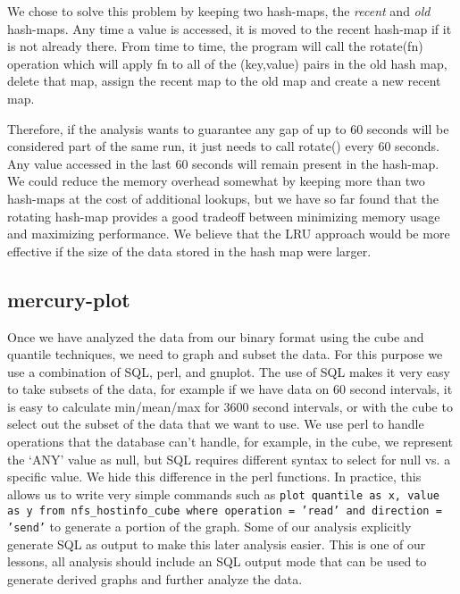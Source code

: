 We chose to solve this problem by keeping two hash-maps, the {\it
recent} and {\it old} hash-maps.  Any time a value is accessed, it is
moved to the recent hash-map if it is not already there.  From time to
time, the program will call the rotate(fn) operation which will apply
fn to all of the (key,value) pairs in the old hash map, delete that map,
assign the recent map to the old map and create a new recent map.

Therefore, if the analysis wants to guarantee any gap of up to 60
seconds will be considered part of the same run, it just needs to call
rotate() every 60 seconds.  Any value accessed in the last 60 seconds
will remain present in the hash-map.  We could reduce the memory
overhead somewhat by keeping more than two hash-maps at the cost of
additional lookups, but we have so far found that the rotating
hash-map provides a good tradeoff between minimizing memory usage and
maximizing performance.  We believe that the LRU approach would be
more effective if the size of the data stored in the hash map were
larger.

\subsection{mercury-plot}

Once we have analyzed the data from our binary format using the cube
and quantile techniques, we need to graph and subset the data.  For
this purpose we use a combination of SQL, perl, and gnuplot.  The use
of SQL makes it very easy to take subsets of the data, for example if
we have data on 60 second intervals, it is easy to calculate
min/mean/max for 3600 second intervals, or with the cube to select out
the subset of the data that we want to use.  We use perl to handle
operations that the database can't handle, for example, in the cube,
we represent the `ANY' value as null, but SQL requires different
syntax to select for null vs. a specific value.  We hide this
difference in the perl functions.  In practice, this allows us to
write very simple commands such as {\tt plot quantile as x, value as y
from nfs\_hostinfo\_cube where operation = 'read' and direction =
'send'} to generate a portion of the graph.  Some of our analysis
explicitly generate SQL as output to make this later analysis easier.
This is one of our lessons, all analysis should include an SQL output
mode that can be used to generate derived graphs and further analyze
the data.

